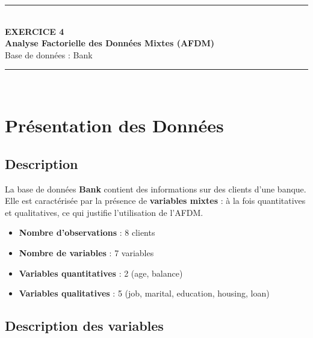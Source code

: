 \documentclass[12pt,a4paper]{article}
\begin{document}
\begin{center}
    \rule{\linewidth}{0.5mm}\\[0.4cm]
    {\Huge \textbf{EXERCICE 4}}\\[0.3cm]
    {\Large \textbf{Analyse Factorielle des Données Mixtes (AFDM)}}\\[0.2cm]
    {\large Base de données : Bank}\\[0.1cm]
    \rule{\linewidth}{0.5mm}\\[1cm]
\end{center}

\section{Présentation des Données}

\subsection{Description}

La base de données \textbf{Bank} contient des informations sur des clients d'une banque. Elle est caractérisée par la présence de \textbf{variables mixtes} : à la fois quantitatives et qualitatives, ce qui justifie l'utilisation de l'AFDM.

\begin{itemize}
    \item \textbf{Nombre d'observations} : 8 clients
    \item \textbf{Nombre de variables} : 7 variables
    \item \textbf{Variables quantitatives} : 2 (age, balance)
    \item \textbf{Variables qualitatives} : 5 (job, marital, education, housing, loan)
\end{itemize}

\subsection{Description des variables}
\end{document}
